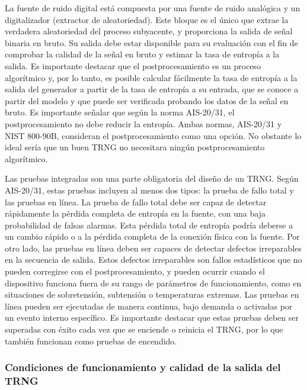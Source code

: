                 La fuente de ruido digital está compuesta por una fuente de ruido analógica y un digitalizador (extractor de aleatoriedad). Este bloque es el único que extrae la verdadera aleatoriedad del proceso subyacente, y proporciona la salida de señal binaria en bruto. Su salida debe estar disponible para su evaluación con el fin de comprobar la calidad de la señal en bruto y estimar la tasa de entropía a la salida. Es importante destacar que el postprocesamiento es un proceso algorítmico y, por lo tanto, es posible calcular fácilmente la tasa de entropía a la salida del generador a partir de la tasa de entropía a su entrada, que se conoce a partir del modelo y que puede ser verificada probando los datos de la señal en bruto. Es importante señalar que según la norma AIS-20/31, el postprocesamiento no debe reducir la entropía. Ambas normas, AIS-20/31 y NIST 800-90B, consideran el postprocesamiento como una opción. No obstante lo ideal sería que un buen TRNG no necesitara ningún postprocesamiento algorítmico.

                Las pruebas integradas son una parte obligatoria del diseño de un TRNG. Según AIS-20/31, estas pruebas incluyen al menos dos tipos: la prueba de fallo total y las pruebas en línea. La prueba de fallo total debe ser capaz de detectar rápidamente la pérdida completa de entropía en la fuente, con una baja probabilidad de falsas alarmas. Esta pérdida total de entropía podría deberse a un cambio rápido o a la pérdida completa de la conexión física con la fuente. Por otro lado, las pruebas en línea deben ser capaces de detectar defectos irreparables en la secuencia de salida. Estos defectos irreparables son fallos estadísticos que no pueden corregirse con el postprocesamiento, y pueden ocurrir cuando el dispositivo funciona fuera de su rango de parámetros de funcionamiento, como en situaciones de sobretensión, subtensión o temperaturas extremas. Las pruebas en línea pueden ser ejecutadas de manera continua, bajo demanda o activadas por un evento interno específico. Es importante destacar que estas pruebas deben ser superadas con éxito cada vez que se enciende o reinicia el TRNG, por lo que también funcionan como pruebas de encendido.

            \subsubsection{Condiciones de funcionamiento y calidad de la salida del TRNG}
	

